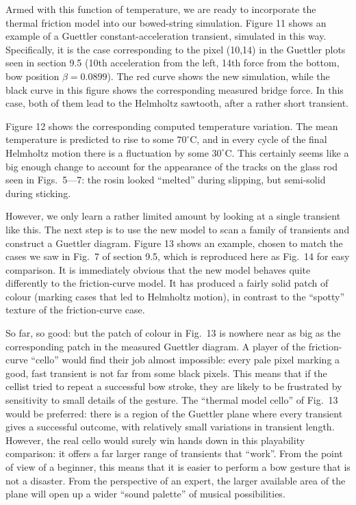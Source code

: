   Armed with this function of temperature, we are ready to incorporate the 
  thermal friction model into our bowed-string simulation. Figure 11 shows an 
  example of a Guettler constant-acceleration transient, simulated in this way. 
  Specifically, it is the case corresponding to the pixel (10,14) in the 
  Guettler plots seen in section 9.5 (10th acceleration from the left, 14th 
  force from the bottom, bow position $\beta=0.0899$). The red curve shows the 
  new simulation, while the black curve in this figure shows the corresponding 
  measured bridge force. In this case, both of them lead to the Helmholtz 
  sawtooth, after a rather short transient. 

  Figure 12 shows the corresponding computed temperature variation. The mean 
  temperature is predicted to rise to some $70^\circ$C, and in every cycle of 
  the final Helmholtz motion there is a fluctuation by some $30^\circ$C. This 
  certainly seems like a big enough change to account for the appearance of the 
  tracks on the glass rod seen in Figs.\ 5—7: the rosin looked ``melted'' 
  during slipping, but semi-solid during sticking. 

  However, we only learn a rather limited amount by looking at a single 
  transient like this. The next step is to use the new model to scan a family 
  of transients and construct a Guettler diagram. Figure 13 shows an example, 
  chosen to match the cases we saw in Fig.\ 7 of section 9.5, which is 
  reproduced here as Fig.\ 14 for easy comparison. It is immediately obvious 
  that the new model behaves quite differently to the friction-curve model. It 
  has produced a fairly solid patch of colour (marking cases that led to 
  Helmholtz motion), in contrast to the “spotty” texture of the friction-curve 
  case. 

  So far, so good: but the patch of colour in Fig.\ 13 is nowhere near as big 
  as the corresponding patch in the measured Guettler diagram. A player of the 
  friction-curve “cello” would find their job almost impossible: every pale 
  pixel marking a good, fast transient is not far from some black pixels. This 
  means that if the cellist tried to repeat a successful bow stroke, they are 
  likely to be frustrated by sensitivity to small details of the gesture. The 
  “thermal model cello” of Fig.\ 13 would be preferred: there is a region of 
  the Guettler plane where every transient gives a successful outcome, with 
  relatively small variations in transient length. However, the real cello 
  would surely win hands down in this playability comparison: it offers a far 
  larger range of transients that “work”. From the point of view of a beginner, 
  this means that it is easier to perform a bow gesture that is not a disaster. 
  From the perspective of an expert, the larger available area of the plane 
  will open up a wider “sound palette” of musical possibilities. 

